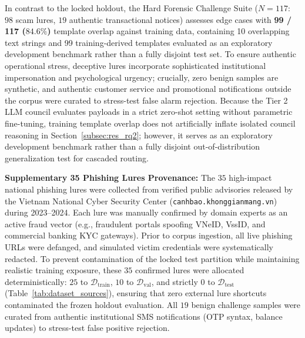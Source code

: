 \documentclass[journal]{IEEEtran}
\begin{document}
In contrast to the locked holdout, the Hard Forensic Challenge Suite ($N=117$: $98$ scam lures, $19$ authentic transactional notices) assesses edge cases with \textbf{99 / 117 ($84.6\%$)} template overlap against training data, containing 10 overlapping text strings and 99 training-derived templates evaluated as an exploratory development benchmark rather than a fully disjoint test set. To ensure authentic operational stress, deceptive lures incorporate sophisticated institutional impersonation and psychological urgency; crucially, zero benign samples are synthetic, and authentic customer service and promotional notifications outside the corpus were curated to stress-test false alarm rejection. Because the Tier 2 LLM council evaluates payloads in a strict zero-shot setting without parametric fine-tuning, training template overlap does not artificially inflate isolated council reasoning in Section~\ref{subsec:res_rq2}; however, it serves as an exploratory development benchmark rather than a fully disjoint out-of-distribution generalization test for cascaded routing.

\textbf{Supplementary 35 Phishing Lures Provenance:} The $35$ high-impact national phishing lures were collected from verified public advisories released by the Vietnam National Cyber Security Center (\texttt{canhbao.khonggianmang.vn}) during 2023--2024. Each lure was manually confirmed by domain experts as an active fraud vector (e.g., fraudulent portals spoofing VNeID, VssID, and commercial banking KYC gateways). Prior to corpus ingestion, all live phishing URLs were defanged, and simulated victim credentials were systematically redacted. To prevent contamination of the locked test partition while maintaining realistic training exposure, these $35$ confirmed lures were allocated deterministically: $25$ to $\mathcal{D}_{\text{train}}$, $10$ to $\mathcal{D}_{\text{val}}$, and strictly $0$ to $\mathcal{D}_{\text{test}}$ (Table~\ref{tab:dataset_sources}), ensuring that zero external lure shortcuts contaminated the frozen holdout evaluation. All $19$ benign challenge samples were curated from authentic institutional SMS notifications (OTP syntax, balance updates) to stress-test false positive rejection.
\end{document}
